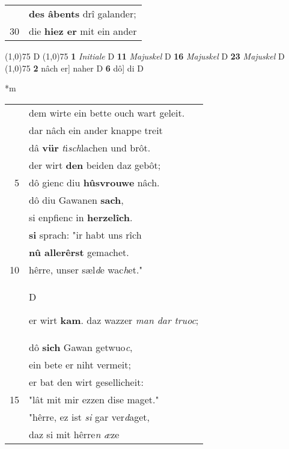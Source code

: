 \documentclass[8pt,a4paper,notitlepage]{article}
\begin{document}
\begin{table}[ht]
\begin{minipage}[t]{0.5\linewidth}
\begin{tabular}{rl}
 & \textbf{des âbents} drî galander;\\ 
30 & die \textbf{hiez er} mit ein ander\\ 
\end{tabular}
\scriptsize
\line(1,0){75} \newline
D \newline
\line(1,0){75} \newline
\textbf{1} \textit{Initiale} D  \textbf{11} \textit{Majuskel} D  \textbf{16} \textit{Majuskel} D  \textbf{23} \textit{Majuskel} D  \newline
\line(1,0){75} \newline
\textbf{2} nâch er] naher D \textbf{6} dô] di D \newline
\end{minipage}
\hspace{0.5cm}
\begin{minipage}[t]{0.5\linewidth}
\small
\begin{center}*m
\end{center}
\begin{tabular}{rl}
 & dem wirte ein bette ouch wart geleit.\\ 
 & dar nâch ein ander knappe treit\\ 
 & dâ \textbf{vür} \textit{t}i\textit{sch}lachen und brôt.\\ 
 & der wirt \textbf{den} beiden daz gebôt;\\ 
5 & dô gienc diu \textbf{hûsvrouwe} nâch.\\ 
 & dô diu Gawanen \textbf{sach},\\ 
 & si enpfienc in \textbf{herzelîch}.\\ 
 & \textbf{si} sprach: "ir habt uns rîch\\ 
 & \textbf{nû allerêrst} gemachet.\\ 
10 & hêrre, unser sæl\textit{d}e wac\textit{h}et."\\ 
 & \begin{large}D\end{large}er wirt \textbf{kam}. daz wazzer \textit{man dar truoc};\\ 
 & dô \textbf{sich} Gawan getwuo\textit{c},\\ 
 & ein bete er niht vermeit;\\ 
 & er bat den wirt gesellicheit:\\ 
15 & "lât mit mir ezzen dise maget."\\ 
 & "hêrre, ez ist \textit{si} gar ver\textit{d}aget,\\ 
 & daz si mit hêrre\textit{n} \textit{æ}ze\\ 

\end{tabular}
\end{minipage}
\end{table}
\end{document}
